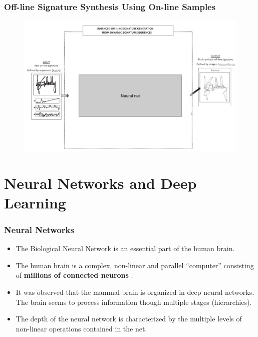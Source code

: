 \documentclass{beamer}
\begin{document}
\begin{frame}
\frametitle{Off-line Signature Synthesis Using On-line Samples}
\begin{figure}[!htb]
\centering
\includegraphics[width=\textwidth]{slides/ienhanced-nn}

\end{figure}
\end{frame}

\section{Neural Networks and Deep Learning}

\begin{frame}
\frametitle{Neural Networks}
\begin{itemize}
\item The Biological Neural Network is an essential part of the human brain.
\item The human brain is a complex, non-linear and parallel ``computer'' consisting of \textbf{millions of connected neurons} \parencite{haykin2009neural}.
\item It was observed that the mammal brain is organized in deep neural networks. The brain seems to process information though multiple stages (hierarchies).
\item The depth of the neural network is characterized by the multiple levels of non-linear operations contained in the net.
\end{itemize}
\end{frame}
\end{document}
